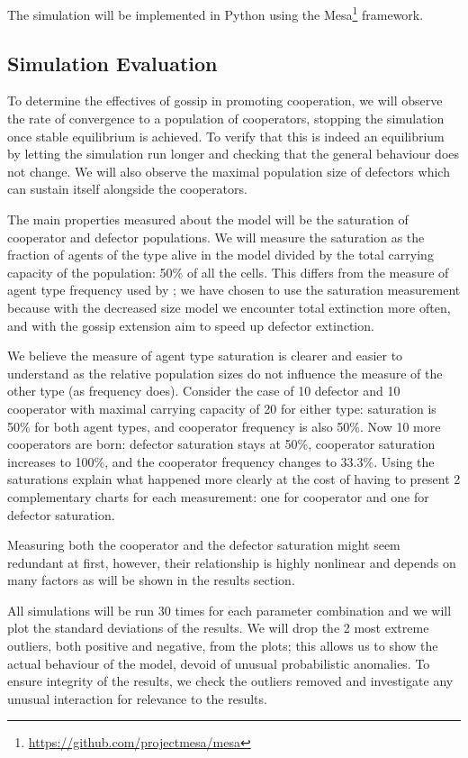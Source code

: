 \documentclass[english]{article}
\begin{document}
The simulation will be implemented in Python using the Mesa\footnote{\url{https://github.com/projectmesa/mesa}} framework.

\subsection{Simulation Evaluation}

To determine the effectives of gossip in promoting cooperation, we will observe the rate of convergence to a population of cooperators, stopping the simulation once stable equilibrium is achieved.
To verify that this is indeed an equilibrium by letting the simulation run longer and checking that the general behaviour does not change.
We will also observe the maximal population size of defectors which can sustain itself alongside the cooperators.

The main properties measured about the model will be the saturation of cooperator and defector populations.
We will measure the saturation as the fraction of agents of the type alive in the model divided by
the total carrying capacity of the population: 50\% of all the cells.
This differs from the measure of agent type frequency used by \citet{smaldino};
we have chosen to use the saturation measurement because with the decreased size model we encounter total extinction more often,
and with the gossip extension aim to speed up defector extinction.

We believe the measure of agent type saturation is clearer and easier to understand
as the relative population sizes do not influence the measure of the other type (as frequency does).
Consider the case of 10 defector and 10 cooperator with maximal carrying capacity of 20 for either type:
saturation is 50\% for both agent types, and cooperator frequency is also 50\%.
Now 10 more cooperators are born:
defector saturation stays at 50\%, cooperator saturation increases to 100\%,
and the cooperator frequency changes to 33.3\%.
Using the saturations explain what happened more clearly at the cost of having to present 2 complementary charts for each measurement:
one for cooperator and one for defector saturation.

Measuring both the cooperator and the defector saturation might seem redundant at first, however, their relationship is highly nonlinear and depends on many factors
as will be shown in the results section.

All simulations will be run 30 times for each parameter combination and we will plot the standard deviations of the results.
We will drop the 2 most extreme outliers, both positive and negative, from the plots; this allows us to show the actual behaviour of the model, devoid of unusual probabilistic anomalies.
To ensure integrity of the results, we check the outliers removed and investigate any unusual interaction for relevance to the results.
\end{document}
